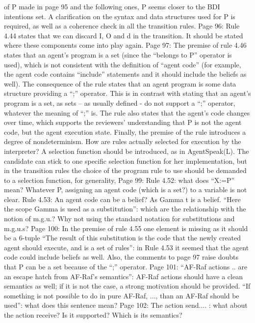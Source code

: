 \documentclass{article}
\begin{document}
of P made in page 95 and the following ones, P seems closer to the BDI intentions set. A clarification
on the syntax and data structures used for P is required, as well as a coherence check in all the
transition rules.
Page 96:
Rule 4.44 states that we can discard I, O and d in the transition. It should be stated where these
components come into play again.
Page 97:
The premise of rule 4.46 states that an agent's program is a set (since the “belongs to P” operator is
used), which is not consistent with the definition of “agent code” (for example, the agent code
contains “include” statements and it should include the beliefs as well). The consequence of the rule
states that an agent program is some data structure providing a “;” operator. This is in contrast with
stating that an agent's program is a set, as sets – as usually defined - do not support a “;” operator,
whatever the meaning of “;” is. The rule also states that the agent's code changes over time, which
supports the reviewers' understanding that P is not the agent code, but the agent execution state.
Finally, the premise of the rule introduces a degree of nondeterminism. How are rules actually
selected for execution by the interpreter? A selection function should be introduced, as in
AgentSpeak(L). The candidate can stick to one specific selection function for her implementation, but
in the transition rules the choice of the program rule to use should be demanded to a selection
function, for generality,
Page 99:
Rule 4.52: what does “X:=P” mean? Whatever P, assigning an agent code (which is a set?) to a
variable is not clear.
Rule 4.53:
An agent code can be a belief? As Gamma t is a belief.
“Here the scope Gamma is used as a substitution”: which are the relationship with the notion of
m.g.u.? Why not using the standard notation for substitutions and m.g.u.s?
Page 100:
In the premise of rule 4.55 one element is missing as it should be a 6-tuple
“The result of this substitution is the code that the newly created agent should execute, and is a set
of rules”: in Rule 4.53 it seemed that the agent code could include beliefs as well. Also, the
comments to page 97 raise doubts that P can be a set because of the “;” operator.
Page 101:
“AF-Raf actions .. are an escape hatch from AF-Raf's semantics”: AF-Raf actions should have a clean
semantics as well; if it is not the case, a strong motivation should be provided.
“If something is not possible to do in pure AF-Raf, ..., than an AF-Raf should be used”: what does this
sentence mean?
Page 102:
The action send.... : what about the action receive? Is it supported? Which is its semantics?
\end{document}
